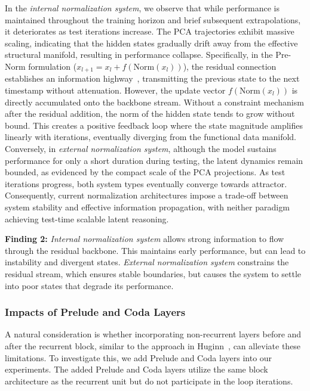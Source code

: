 In the \textit{internal normalization system}, we observe that while performance is maintained throughout the training horizon and brief subsequent extrapolations, it deteriorates as test iterations increase. The PCA trajectories exhibit massive scaling, indicating that the hidden states gradually drift away from the effective structural manifold, resulting in performance collapse. Specifically, in the Pre-Norm formulation ($x_{l+1} = x_l + f(\text{Norm}(x_l))$), the residual connection establishes an information highway~\citep{he2016deep}, transmitting the previous state to the next timestamp without attenuation. However, the update vector \( f(\text{Norm}(x_l)) \) is directly accumulated onto the backbone stream. Without a constraint mechanism after the residual addition, the norm of the hidden state tends to grow without bound. This creates a positive feedback loop where the state magnitude amplifies linearly with iterations, eventually diverging from the functional data manifold.
Conversely, in \textit{external normalization system}, although the model sustains performance for only a short duration during testing, the latent dynamics remain bounded, as evidenced by the compact scale of the PCA projections. As test iterations progress, both system types eventually converge towards attractor.
Consequently, current normalization architectures impose a trade-off between system stability and effective information propagation, with neither paradigm achieving test-time scalable latent reasoning.
\begin{findings}
 \textbf{Finding 2:} \textit{Internal normalization system} allows strong information to flow through the residual backbone. This maintains early performance, but can lead to instability and divergent states. \textit{External normalization system} constrains the residual stream, which ensures stable boundaries, but causes the system to settle into poor states that degrade its performance.
\end{findings}
\subsubsection{Impacts of Prelude and Coda Layers}
A natural consideration is whether incorporating non-recurrent layers before and after the recurrent block, similar to the approach in Huginn~\citep{geiping2025scaling}, can alleviate these limitations. To investigate this, we add Prelude and Coda layers into our experiments.  The added Prelude and Coda layers utilize the same block architecture as the recurrent unit but do not participate in the loop iterations.

